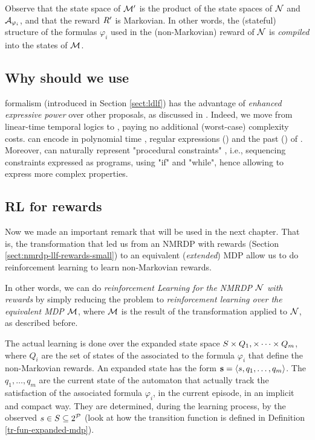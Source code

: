 Observe that the state space of $\mathcal{M}'$ is the product of 
the state spaces of $\mathcal{N}$ and $\mathcal{A}_{\varphi_i}$, and that the reward
$R'$ is Markovian. In other words, the (stateful) structure of
the \LLf formulas $\varphi_i$ used in the 
(non-Markovian) reward of $\mathcal{N}$ is \emph{compiled} into 
the states of $\mathcal{M}$.

\subsection*{Why should we use \LDLf}
\LDLf formalism (introduced in Section \ref{sect:ldlf})  has the advantage of \emph{enhanced expressive power} over other proposals, as discussed in \citep{AAAI1817342}. Indeed, we move from linear-time temporal logics to \LDLf, paying no additional (worst-case) complexity costs. \LDLf can encode in polynomial time \LTLf, regular expressions (\REGEX) and the past \LTL (\PLTL) of \citep{bacchus1996rewarding}.
	Moreover, \LDLf can naturally
	represent "procedural constraints" \citep{Baier:2008:BCP:1620270.1620321}, i.e.,
	sequencing constraints expressed as programs, using "if" and
	"while", hence allowing to express more complex properties.

\subsection{RL for \LLf rewards}
Now we made an important remark that will be used in the next chapter. That is, the transformation that led us from an NMRDP with \LLf rewards (Section \ref{sect:nmrdp-llf-rewards-small}) to an equivalent (\emph{extended}) MDP allow us to do reinforcement learning to learn \LLf non-Markovian rewards. 

In other words, we can do \emph{reinforcement Learning for the NMRDP $\mathcal{N}$ with \LLf rewards} by simply reducing the problem to \emph{reinforcement learning over the equivalent MDP $\mathcal{M}$}, where $\mathcal{M}$ is the result of the transformation applied to $\mathcal{N}$, as described before. 

The actual learning is done over the expanded state space $S \times Q_1, \times \dots \times Q_m$, where $Q_i$ are the set of states of the \DFA associated to the formula $\varphi_i$ that define the non-Markovian rewards. An expanded state has the form $\mathbf{s} = \langle s, q_1, \dots, q_m \rangle$. The $q_1, \dots, q_m$ are the current state of the automaton that actually track the satisfaction of the associated formula $\varphi_i$, in the current episode, in an implicit and compact way. They are determined, during the learning process, by the observed $s \in S \subseteq 2^{\mathcal{P}}$ (look at how the transition function is defined in Definition \ref{tr-fun-expanded-mdp}).

